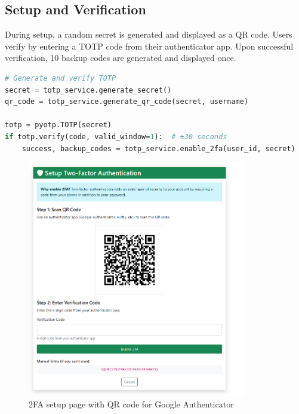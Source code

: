 \documentclass[12pt,a4paper]{article}
\begin{document}
\subsection{Setup and Verification}

During setup, a random secret is generated and displayed as a QR code. Users verify by entering a TOTP code from their authenticator app. Upon successful verification, 10 backup codes are generated and displayed once.

\begin{lstlisting}[language=Python]
# Generate and verify TOTP
secret = totp_service.generate_secret()
qr_code = totp_service.generate_qr_code(secret, username)

totp = pyotp.TOTP(secret)
if totp.verify(code, valid_window=1):  # ±30 seconds
    success, backup_codes = totp_service.enable_2fa(user_id, secret)
\end{lstlisting}

\begin{figure}[H]
    \centering
    \includegraphics[width=0.85\textwidth]{screenshots/2fa_setup_qr.png}
    \caption{2FA setup page with QR code for Google Authenticator}
    \label{fig:2fa_setup}
\end{figure}
\end{document}

